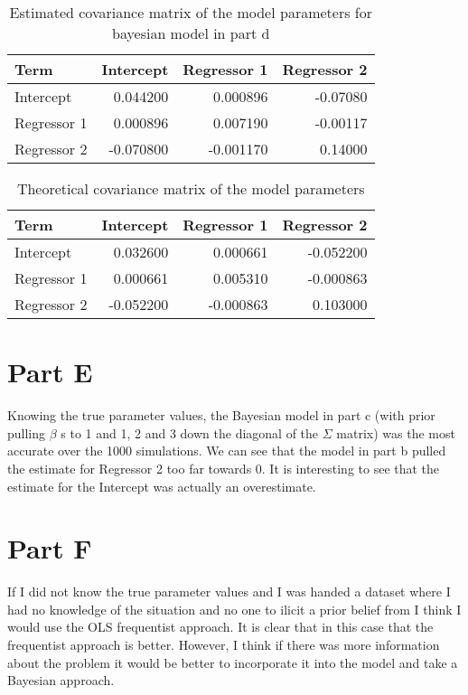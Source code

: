 \documentclass[]{book}
\begin{document}
\begin{table}

\caption{\label{tab:bayes-d-est-vcov-q3}Estimated covariance matrix of the model parameters for bayesian model in part d}
\centering
\begin{tabular}[t]{lrrr}
\toprule
Term & Intercept & Regressor 1 & Regressor 2\\
\midrule
Intercept & 0.044200 & 0.000896 & -0.07080\\
Regressor 1 & 0.000896 & 0.007190 & -0.00117\\
Regressor 2 & -0.070800 & -0.001170 & 0.14000\\
\bottomrule
\end{tabular}
\end{table}

\begin{table}

\caption{\label{tab:theory-vcov-d-q3}Theoretical covariance matrix of the model parameters}
\centering
\begin{tabular}[t]{lrrr}
\toprule
Term & Intercept & Regressor 1 & Regressor 2\\
\midrule
Intercept & 0.032600 & 0.000661 & -0.052200\\
Regressor 1 & 0.000661 & 0.005310 & -0.000863\\
Regressor 2 & -0.052200 & -0.000863 & 0.103000\\
\bottomrule
\end{tabular}
\end{table}

\hypertarget{part-e-1}{%
\section{Part E}\label{part-e-1}}

Knowing the true parameter values, the Bayesian model in part c (with prior pulling \(\beta\) s to 1 and 1, 2 and 3 down the diagonal of the \(\Sigma\) matrix) was the most accurate over the 1000 simulations. We can see that the model in part b pulled the estimate for Regressor 2 too far towards 0. It is interesting to see that the estimate for the Intercept was actually an overestimate.

\hypertarget{part-f-1}{%
\section{Part F}\label{part-f-1}}

If I did not know the true parameter values and I was handed a dataset where I had no knowledge of the situation and no one to ilicit a prior belief from I think I would use the OLS frequentist approach. It is clear that in this case that the frequentist approach is better. However, I think if there was more information about the problem it would be better to incorporate it into the model and take a Bayesian approach.
\end{document}
